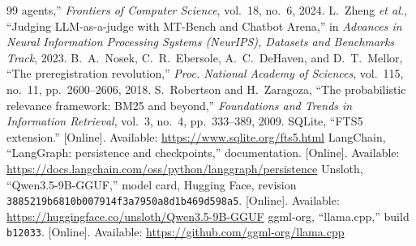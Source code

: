 \begin{thebibliography}{99}
agents,'' \emph{Frontiers of Computer Science}, vol.~18, no.~6, 2024.
 L.~Zheng \emph{et al.}, ``Judging LLM-as-a-judge with MT-Bench and Chatbot
Arena,'' in \emph{Advances in Neural Information Processing Systems (NeurIPS), Datasets and
Benchmarks Track}, 2023.
 B.~A.~Nosek, C.~R.~Ebersole, A.~C.~DeHaven, and D.~T.~Mellor, ``The
preregistration revolution,'' \emph{Proc. National Academy of Sciences}, vol.~115, no.~11,
pp.~2600--2606, 2018.
 S.~Robertson and H.~Zaragoza, ``The probabilistic relevance framework:
BM25 and beyond,'' \emph{Foundations and Trends in Information Retrieval}, vol.~3, no.~4,
pp.~333--389, 2009.
 SQLite, ``FTS5 extension.'' [Online]. Available: \url{https://www.sqlite.org/fts5.html}
 LangChain, ``LangGraph: persistence and checkpoints,'' documentation. [Online].
Available: \url{https://docs.langchain.com/oss/python/langgraph/persistence}
 Unsloth, ``Qwen3.5-9B-GGUF,'' model card, Hugging Face, revision
\texttt{3885219b6810b007914f3a7950a8d1b469d598a5}. [Online]. Available:
\url{https://huggingface.co/unsloth/Qwen3.5-9B-GGUF}
 ggml-org, ``llama.cpp,'' build \texttt{b12033}. [Online]. Available:
\url{https://github.com/ggml-org/llama.cpp}
\end{thebibliography}
